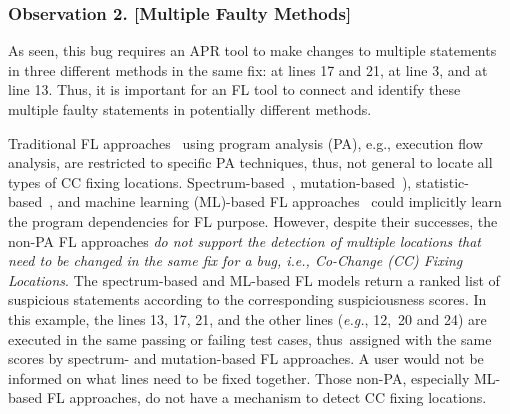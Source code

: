 

\subsubsection{{\bf Observation 2. [Multiple Faulty Methods]}}

As seen, this bug requires an APR tool to make changes to multiple
statements in three different methods in the same fix:
  at lines 17 and 21,  at line
3, and  at line 13. Thus, it is important for an
FL tool to connect and identify these multiple faulty statements in
potentially different methods.


Traditional FL approaches~\cite{zhang-fse09,ICICA-10} using program
analysis (PA), e.g., execution flow analysis, are restricted to
specific PA techniques, thus, not general to locate all types of CC
fixing locations.
Spectrum-based~\cite{jones2005empirical,abreu2006evaluation},
mutation-based~\cite{MUSE,papadakis2012using,Metallaxis}),
statistic-based~\cite{liblit-pldi05}, and machine learning (ML)-based
FL approaches~\cite{DeepFL,icse21-fl} could implicitly learn the
program dependencies for FL purpose. However, despite their successes,
the non-PA FL approaches {\em do not support the detection of multiple
  locations that need to be changed in the same fix for a bug, i.e.,
  Co-Change (CC) Fixing Locations}.
%
The spectrum-based and ML-based FL models return a ranked list of
suspicious statements according to the corresponding suspiciousness
scores. In this example, the lines 13, 17, 21, and the other lines
({\em e.g.}, 12,~20 and 24) are executed in the same passing or
failing test cases, thus~assigned with the same scores by
spectrum- and mutation-based FL approaches. A user would not be
informed on what lines need to be fixed together. Those non-PA,
especially ML-based FL approaches, do not have a mechanism to detect CC
fixing locations.

